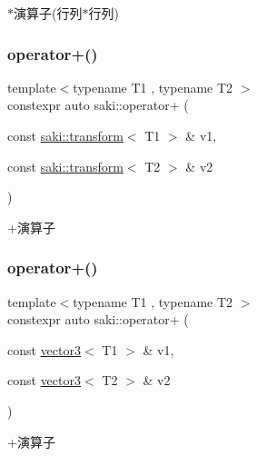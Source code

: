 $\ast$演算子(行列$\ast$行列) 

\mbox{\label{namespacesaki_a8f643bf5bc8002b1fefb916ff9c1d56a}} 
\subsubsection{\texorpdfstring{operator+()}{operator+()}\hspace{0.1cm}{\footnotesize\ttfamily [1/5]}}
{\footnotesize\ttfamily template$<$typename T1 , typename T2 $>$ \\
constexpr auto saki\+::operator+ (\begin{DoxyParamCaption}\item[{const \mbox{\hyperlink{classsaki_1_1transform}{saki\+::transform}}$<$ T1 $>$ \&}]{v1,  }\item[{const \mbox{\hyperlink{classsaki_1_1transform}{saki\+::transform}}$<$ T2 $>$ \&}]{v2 }\end{DoxyParamCaption})}



+演算子 

\mbox{\label{namespacesaki_af2eb9872710ab7ebca5e7a665f1a7cd7}} 
\subsubsection{\texorpdfstring{operator+()}{operator+()}\hspace{0.1cm}{\footnotesize\ttfamily [2/5]}}
{\footnotesize\ttfamily template$<$typename T1 , typename T2 $>$ \\
constexpr auto saki\+::operator+ (\begin{DoxyParamCaption}\item[{const \mbox{\hyperlink{classsaki_1_1vector3}{vector3}}$<$ T1 $>$ \&}]{v1,  }\item[{const \mbox{\hyperlink{classsaki_1_1vector3}{vector3}}$<$ T2 $>$ \&}]{v2 }\end{DoxyParamCaption})}



+演算子 

\mbox{\label{namespacesaki_aba02830a0fe4fd92a264f80bd5f6cd65}} 
